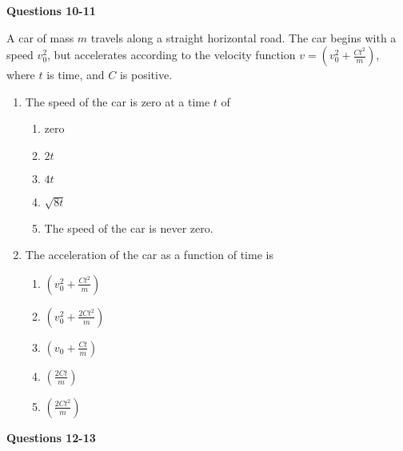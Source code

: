 \documentclass{../../oss-apphys}
\begin{document}
\begin{multicols}{2}
  \textbf{Questions 10-11}

  A car of mass $m$ travels along a straight horizontal road. The car begins
  with a speed $v_0^2$, but accelerates according to the velocity function
  $\displaystyle v=\left(v_0^2+\frac{Ct^2}{m}\right)$, where $t$ is time, and
  $C$ is positive.

  \begin{enumerate}[resume,leftmargin=18pt]
  \item The speed of the car is zero at a time $t$ of
    \begin{enumerate}[noitemsep,topsep=0pt,leftmargin=18pt,label=(\Alph*)]
    \item zero
    \item $2t$
    \item $4t$
    \item $\sqrt{8t}$
    \item The speed of the car is never zero.
    \end{enumerate}
    
  \item The acceleration of the car as a function of time is
    \begin{enumerate}[noitemsep,topsep=0pt,leftmargin=18pt,label=(\Alph*)]
    \item $\displaystyle\left(v_0^2+\frac{Ct^2}{m}\right)$
    \item $\displaystyle\left(v_0^2+\frac{2Ct^2}{m}\right)$
    \item $\displaystyle\left(v_0+\frac{Ct}{m}\right)$
    \item $\displaystyle\left(\frac{2Ct}{m}\right)$
    \item $\displaystyle\left(\frac{2Ct^2}{m}\right)$
    \end{enumerate}
  \end{enumerate}
  \columnbreak
  
  \textbf{Questions 12-13}


\end{multicols}
\end{document}
